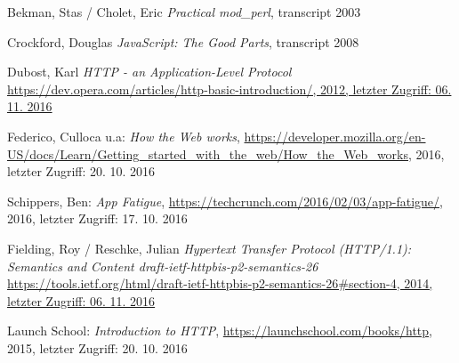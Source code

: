 \begin{thebibliography}{}

Bekman, Stas / Cholet, Eric
\emph{Practical mod\_perl}, transcript 2003

Crockford, Douglas 
\emph{JavaScript: The Good Parts}, transcript 2008

Dubost, Karl
\emph{HTTP - an Application-Level Protocol}
\url{https://dev.opera.com/articles/http-basic-introduction/, 2012, letzter Zugriff: 06. 11. 2016 }

Federico, Culloca u.a:
\emph{How the Web works}, 
\url{https://developer.mozilla.org/en-US/docs/Learn/Getting_started_with_the_web/How_the_Web_works}, 2016, letzter Zugriff: 20. 10. 2016

Schippers, Ben: 
\emph{App Fatigue}, 
\url{https://techcrunch.com/2016/02/03/app-fatigue/}, 2016, letzter Zugriff: 17. 10. 2016

Fielding, Roy / Reschke, Julian
\emph{Hypertext Transfer Protocol (HTTP/1.1): Semantics and Content draft-ietf-httpbis-p2-semantics-26}
\url{https://tools.ietf.org/html/draft-ietf-httpbis-p2-semantics-26#section-4, 2014, letzter Zugriff: 06. 11. 2016 }

Launch School: 
\emph{Introduction to HTTP}, 
\url{https://launchschool.com/books/http}, 2015, letzter Zugriff: 20. 10. 2016

\end{thebibliography}